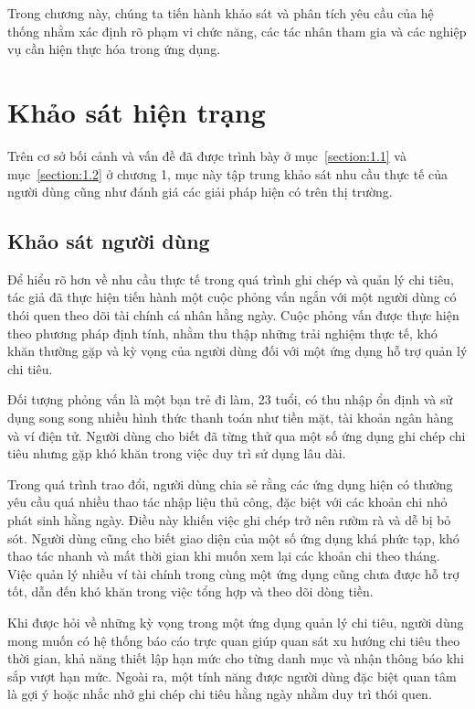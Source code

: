 \documentclass[../DoAn.tex]{subfiles}
\begin{document}
Trong chương này, chúng ta tiến hành khảo sát và phân tích yêu cầu của hệ thống nhằm xác định rõ phạm vi chức năng, các tác nhân tham gia và các nghiệp vụ cần hiện thực hóa trong ứng dụng.

\section{Khảo sát hiện trạng}
\label{section:2.1}

Trên cơ sở bối cảnh và vấn đề đã được trình bày ở mục~\ref{section:1.1} và mục~\ref{section:1.2} ở chương 1, mục này tập trung khảo sát nhu cầu thực tế của người dùng cũng như đánh giá các giải pháp hiện có trên thị trường.

\subsection{Khảo sát người dùng}

Để hiểu rõ hơn về nhu cầu thực tế trong quá trình ghi chép và quản lý chi tiêu, tác giả đã thực hiện tiến hành một cuộc phỏng vấn ngắn với một người dùng có thói quen theo dõi tài chính cá nhân hằng ngày. Cuộc phỏng vấn được thực hiện theo phương pháp định tính, nhằm thu thập những trải nghiệm thực tế, khó khăn thường gặp và kỳ vọng của người dùng đối với một ứng dụng hỗ trợ quản lý chi tiêu.

Đối tượng phỏng vấn là một bạn trẻ đi làm, 23 tuổi, có thu nhập ổn định và sử dụng song song nhiều hình thức thanh toán như tiền mặt, tài khoản ngân hàng và ví điện tử. Người dùng cho biết đã từng thử qua một số ứng dụng ghi chép chi tiêu nhưng gặp khó khăn trong việc duy trì sử dụng lâu dài.

Trong quá trình trao đổi, người dùng chia sẻ rằng các ứng dụng hiện có thường yêu cầu quá nhiều thao tác nhập liệu thủ công, đặc biệt với các khoản chi nhỏ phát sinh hằng ngày. Điều này khiến việc ghi chép trở nên rườm rà và dễ bị bỏ sót. Người dùng cũng cho biết giao diện của một số ứng dụng khá phức tạp, khó thao tác nhanh và mất thời gian khi muốn xem lại các khoản chi theo tháng. Việc quản lý nhiều ví tài chính trong cùng một ứng dụng cũng chưa được hỗ trợ tốt, dẫn đến khó khăn trong việc tổng hợp và theo dõi dòng tiền.

Khi được hỏi về những kỳ vọng trong một ứng dụng quản lý chi tiêu, người dùng mong muốn có hệ thống báo cáo trực quan giúp quan sát xu hướng chi tiêu theo thời gian, khả năng thiết lập hạn mức cho từng danh mục và nhận thông báo khi sắp vượt hạn mức. Ngoài ra, một tính năng được người dùng đặc biệt quan tâm là gợi ý hoặc nhắc nhở ghi chép chi tiêu hằng ngày nhằm duy trì thói quen.
\end{document}
